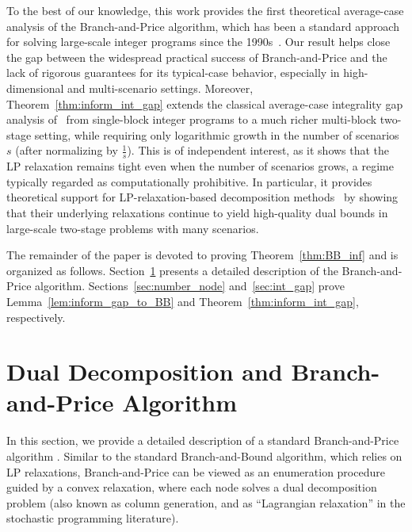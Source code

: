 \documentclass{article}
\begin{document}
To the best of our knowledge, this work provides the first theoretical
average-case analysis of the Branch-and-Price algorithm, which has been a
standard approach for solving large-scale integer programs since the
1990s~\cite{lubbecke2010column,desaulniers2006column}. Our result helps close the gap between the widespread practical success of Branch-and-Price
and the lack of rigorous guarantees for its typical-case behavior, especially
in high-dimensional and multi-scenario settings.
Moreover, Theorem~\ref{thm:inform_int_gap} extends the classical average-case integrality gap
analysis of~\cite{dyer1989probabilistic} from single-block integer programs to
a much richer multi-block two-stage setting, while requiring only logarithmic
growth in the number of scenarios~$s$ (after normalizing by $\frac{1}{s}$).
This is of independent interest, as it shows that the LP relaxation remains
tight even when the number of scenarios grows, a regime typically regarded as
computationally prohibitive. In particular, it provides theoretical support for
LP-relaxation-based decomposition methods~\cite{angulo2016improving,chen2022generating}
by showing that their underlying relaxations continue to yield high-quality
dual bounds in large-scale two-stage problems with many scenarios.

The remainder of the paper is devoted to proving Theorem~\ref{thm:BB_inf} and is organized as follows.
Section~\ref{sec:BB} presents a detailed description of the Branch-and-Price algorithm. Sections~\ref{sec:number_node} and~\ref{sec:int_gap} prove Lemma~\ref{lem:inform_gap_to_BB} and Theorem~\ref{thm:inform_int_gap}, respectively.
\section{Dual Decomposition and Branch-and-Price Algorithm}
\label{sec:BB}


In this section, we provide a detailed description of a standard Branch-and-Price algorithm \cite{barnhart1998branch,lubbecke2010column,desaulniers2006column}. %
Similar to the standard Branch-and-Bound algorithm, which relies on LP relaxations, Branch-and-Price can be viewed as an enumeration procedure guided by a convex relaxation, where each node solves a dual decomposition problem (also known as column generation, and as ``Lagrangian relaxation'' in the stochastic programming literature). %
\end{document}
